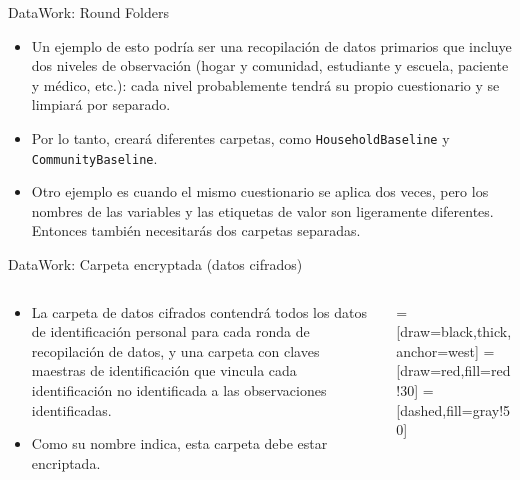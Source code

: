 \documentclass[11pt, aspectratio=169, compress]{beamer}
\begin{document}
\begin{frame}{DataWork: Round Folders}
	\begin{itemize}
		\item Un ejemplo de esto podría ser una recopilación de datos primarios que incluye dos niveles de observación (hogar y comunidad, estudiante y escuela, paciente y médico, etc.): cada nivel probablemente tendrá su propio cuestionario y se limpiará por separado.
		\item Por lo tanto, creará diferentes carpetas, como \texttt{HouseholdBaseline} y \texttt{CommunityBaseline}.
		\item Otro ejemplo es cuando el mismo cuestionario se aplica dos veces, pero los nombres de las variables y las etiquetas de valor son ligeramente diferentes. Entonces también necesitarás dos carpetas separadas.
	\end{itemize}
\end{frame}
\begin{frame}[t]{DataWork: Carpeta encryptada (datos cifrados)}
	\begin{columns}
		\begin{column}{0.5\textwidth}
		   \begin{itemize}
			   \item La carpeta de datos cifrados contendrá todos los datos de identificación personal para cada ronda de recopilación de datos, y una carpeta con claves maestras de identificación que vincula cada identificación no identificada a las observaciones identificadas.   
			  \item Como su nombre indica, esta carpeta debe estar encriptada.
		   \end{itemize}
		\end{column}
		\begin{column}{0.5\textwidth} 
			=[draw=black,thick,anchor=west]
			=[draw=red,fill=red!30]
			=[dashed,fill=gray!50]
		\end{column}
	\end{columns}
\end{frame}
\end{document}
